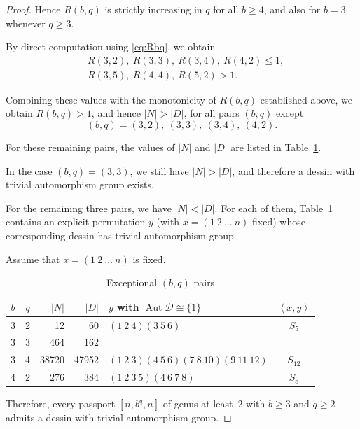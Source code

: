 \documentclass[12pt,reqno]{amsart}
\newcommand{\msD}{\mathscr{D}}
\newcommand{\vt}[1]{\left\lvert #1 \right\rvert}					%
\newcommand{\gen}[1]{\left\langle #1 \right\rangle}				%
\DeclareMathOperator{\Aut}{Aut}							%
\theoremstyle{mythmstyle}
\theoremstyle{mydefstyle}
\newcommand{\tabref}[1]{Table~\ref{#1}}
\newcommand{\AD}{\Aut{\msD}}
\numberwithin{equation}{section}
\begin{document}
\begin{proof}
Hence $R(b,q)$ is strictly increasing in $q$
for all $b \ge 4$, and also for $b=3$ whenever $q \ge 3$.

By direct computation using \eqref{eq:Rbq}, we obtain
\begin{align}
&R(3,2),\ R(3,3),\ R(3,4),\ R(4,2) \le 1, \\
&R(3,5),\ R(4,4),\ R(5,2) > 1.
\end{align}

Combining these values with the monotonicity of $R(b,q)$ established above,
we obtain $R(b,q)>1$, and hence $\vt{N}>\vt{D}$,
for all pairs $(b,q)$ except
\[
(b,q)=(3,2),\ (3,3),\ (3,4),\ (4,2).
\]

For these remaining pairs, 
the values of $\vt{N}$ and $\vt{D}$ are listed in
\tabref{tab:exceptionbq}.

In the case $(b,q)=(3,3)$, we still have $\vt{N} > \vt{D}$,
and therefore a dessin with trivial automorphism group exists.

For the remaining three pairs, we have $\vt{N}<\vt{D}$.
For each of them, \tabref{tab:exceptionbq} contains an explicit permutation
$y$ (with $x=(1\ 2\ \ldots\ n)$ fixed) whose corresponding dessin
has trivial automorphism group.

\begin{table}[htbp]
\centering
Assume that $x=(1\ 2\ \ldots\ n)$ is fixed. \\
\begin{tabular}{|c|c|r|r|l|c|}
\hline
$b$ & $q$ & $\vt{N}$ & $\vt{D}$ & $y$ with $\AD \cong \{ 1 \}$ & $\gen{x, y}$ \\
\hline
3 & 2 & 12 & 60 & $(1\ 2\ 4)(3\ 5\ 6)$ & $S_{5}$ \\
\hline
3 & 3 & 464 & 162 &  &  \\
\hline
3 & 4 & 38720 & 47952 & $(1\ 2\ 3)(4\ 5\ 6)(7\ 8\ 10)(9\ 11\ 12)$ & $S_{12}$ \\
\hline
4 & 2 & 276 & 384 & $(1\ 2\ 3\ 5)(4\ 6\ 7\ 8)$ & $S_{8}$ \\
\hline
\end{tabular}
\vspace{1\baselineskip}
\caption{Exceptional $(b, q)$ pairs}\label{tab:exceptionbq}
\end{table}

Therefore, every passport $[n, b^{q}, n]$ of genus at least~$2$ with $b \ge 3$ and $q \ge 2$ admits a dessin with trivial automorphism group.
\end{proof}
\end{document}
